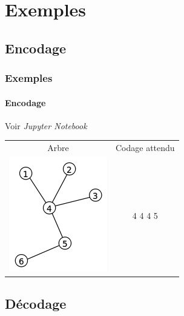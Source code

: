 \documentclass[11pt]{beamer}
\begin{document}
\section{Exemples}

\subsection{Encodage}
\begin{frame}
\end{frame}

\begin{frame}
\frametitle{Exemples}
\framesubtitle{Encodage}

\begin{center}
Voir \textit{Jupyter Notebook}\\
\vspace{0.5cm}
\begin{table}[]
\centering
\begin{tabular}{c|c}
 Arbre&  Codage attendu\\
 \includegraphics[scale=0.40]{exempleArbre.png}& 4 4 4 5
\end{tabular}
\end{table}
\end{center}
\end{frame}

\subsection{Décodage}
\begin{frame}
\end{frame}
\end{document}
